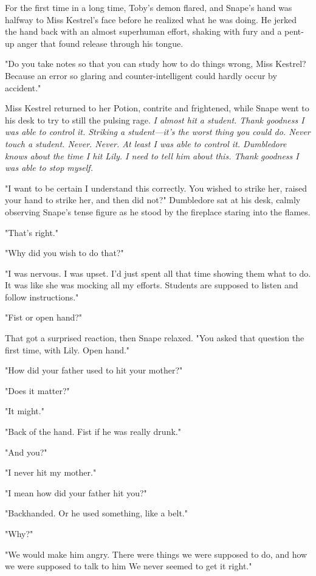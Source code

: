 For the first time in a long time, Toby's demon flared, and Snape's hand was halfway to Miss Kestrel's face before he realized what he was doing. He jerked the hand back with an almost superhuman effort, shaking with fury and a pent-up anger that found release through his tongue.

"Do you take notes so that you can study how to do things wrong, Miss Kestrel? Because an error so glaring and counter-intelligent could hardly occur by accident."

Miss Kestrel returned to her Potion, contrite and frightened, while Snape went to his desk to try to still the pulsing rage. \emph{I almost hit a student. Thank goodness I was able to control it. Striking a student—it's the worst thing you could do. Never touch a student. Never. Never. At least I was able to control it. Dumbledore knows about the time I hit Lily. I need to tell him about this. Thank goodness I was able to stop myself.}

"I want to be certain I understand this correctly. You wished to strike her, raised your hand to strike her, and then did not?" Dumbledore sat at his desk, calmly observing Snape's tense figure as he stood by the fireplace staring into the flames.

"That's right."

"Why did you wish to do that?"

"I was nervous. I was upset. I'd just spent all that time showing them what to do. It was like she was mocking all my efforts. Students are supposed to listen and follow instructions."

"Fist or open hand?"

That got a surprised reaction, then Snape relaxed. "You asked that question the first time, with Lily. Open hand."

"How did your father used to hit your mother?"

"Does it matter?"

"It might."

"Back of the hand. Fist if he was really drunk."

"And you?"

"I never hit my mother."

"I mean how did your father hit you?"

"Backhanded. Or he used something, like a belt."

"Why?"

"We would make him angry. There were things we were supposed to do, and{\el} how we were supposed to talk to him{\el} We never seemed to get it right."

